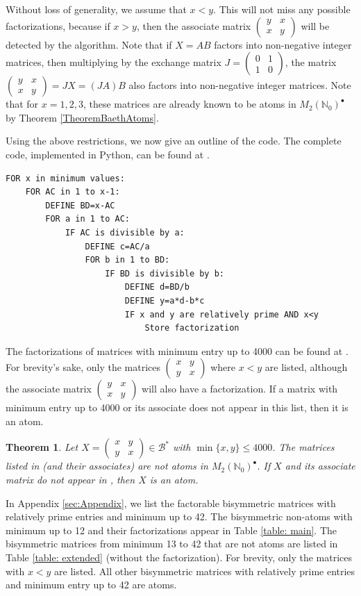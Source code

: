 \documentclass{amsart}
\newcommand{\pmx}[4]{\begin{pmatrix} #1 & #2 \\ #3 & #4 \end{pmatrix}}
\newcommand{\mtwo}{M_2(\mathbb{N}_0)^\bullet}
\newcommand{\Bstar}{\mathcal{B}^*}
\newtheorem{theorem}{Theorem}[section]
\begin{document}
Without loss of generality, we assume that $x<y$. This will not miss any possible factorizations, because if $x>y$, then the associate matrix $\pmx{y}{x}{x}{y}$ will be detected by the algorithm. Note that if $X=AB$ factors into non-negative integer matrices, then multiplying by the exchange matrix $J = \pmx{0}{1}{1}{0}$, the matrix $\pmx{y}{x}{x}{y}=JX=(JA)B$ also factors into non-negative integer matrices.  Note that for $x=1,2,3$, these matrices are already known to be atoms in $\mtwo$ by Theorem \ref{TheoremBaethAtoms}. 


Using the above restrictions, we now give an outline of the code. The complete code, implemented in Python, can be found  at \cite{BisymData26}.

\bigskip

\begin{verbatim}
FOR x in minimum values:
    FOR AC in 1 to x-1:
        DEFINE BD=x-AC
        FOR a in 1 to AC:
            IF AC is divisible by a:
                DEFINE c=AC/a
                FOR b in 1 to BD:
                    IF BD is divisible by b:
                        DEFINE d=BD/b
                        DEFINE y=a*d-b*c
                        IF x and y are relatively prime AND x<y
                            Store factorization
\end{verbatim}


The factorizations of matrices with minimum entry up to 4000 can be found at \cite{BisymData26}. For brevity's sake, only the matrices $\pmx{x}{y}{y}{x}$ where $x<y$ are listed, although the associate matrix $\pmx{y}{x}{x}{y}$ will also have a factorization. If a matrix with minimum entry up to 4000 or its associate does not appear in this list, then it is an atom.  

\begin{theorem}\label{thm: algorithm}
Let $X=\pmx{x}{y}{y}{x} \in \Bstar$ with $\min\{x,y\}\leq 4000$. The matrices listed in \cite{BisymData26} (and their associates) are not atoms in $\mtwo$. If $X$ and its associate matrix do not appear in \cite{BisymData26}, then $X$ is an atom.
\end{theorem}

In Appendix \ref{sec:Appendix}, we list the factorable bisymmetric matrices with relatively prime entries and minimum up to 42. The bisymmetric non-atoms with minimum up to 12 and their factorizations appear in Table \ref{table: main}. The bisymmetric matrices from minimum 13 to 42 that are not atoms are listed in Table \ref{table: extended} (without the factorization). For brevity, only the matrices with $x<y$ are listed. All other bisymmetric matrices with relatively prime entries and minimum entry up to 42 are atoms.
\end{document}
